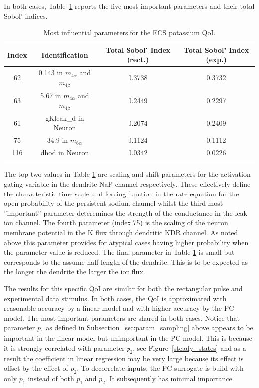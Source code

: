 In both cases, Table~\ref{tab:K_ECS_Mean} reports the five most important parameters and their total Sobol' indices. 


\begin{table}[h]
\centering
{}
\begin{tabular}{cccc}
\toprule
Index & Identification & Total Sobol' Index (rect.) & Total Sobol' Index (exp.)\\
\midrule
62 & 0.143 in $m_{4\alpha}$ and $m_{4 \beta}$ &  0.3738 & 0.3732\\
63 & 5.67 in $m_{4\alpha}$ and $m_{4 \beta}$  &  0.2449 & 0.2297\\
61 & gKleak\_d in Neuron &0.2074 & 0.2409\\
75 & 34.9 in $m_{6 \alpha}$ & 0.1124 & 0.1112\\
116 & dhod in Neuron & 0.0342 & 0.0226\\
 \arrayrulecolor{black}\bottomrule
\end{tabular}
\caption{Most influential parameters for the ECS potassium QoI.}
\label{tab:K_ECS_Mean}
\end{table}

The top two values in Table \ref{tab:K_ECS_Mean} are scaling and shift parameters for the activation gating variable in the dendrite NaP channel respectively. These effectively define the characteristic time scale and forcing function in the rate equation for the open  probability of the persistent sodium channel whilst the third most ''important'' parameter deteremines the strength of the  conductance in the \pot leak ion channel. The fourth parameter (index 75) is the scaling of the neuron membrane potential in the K flux through dendritic KDR channel. As noted above this parameter provides for atypical cases having higher probability when the parameter value is reduced. The final parameter in Table \ref{tab:K_ECS_Mean} is small but corresponds to the assume half-length of the dendrite. This is to be expected as the longer the dendrite the larger the ion flux. 

The results for this specific QoI are similar for both the rectangular pulse and experimental data stimulus. In both cases, the QoI is approximated with reasonable accuracy by a linear model and with higher accuracy by the PC model. The most important parameters are shared in both cases. Notice that parameter $p_1$ as defined in Subsection~\ref{sec:param_sampling} above appears to be important in the linear model but unimportant in the PC model. This is because it is strongly correlated with parameter $p_2$, see Figure~\ref{steady_states}  and as a result the coefficient in linear regression may be very large because its effect is offset by the effect of $p_2$. To decorrelate inputs, the PC surrogate is build with only $p_1$ instead of both $p_1$ and $p_2$. It subsequently has minimal importance.

